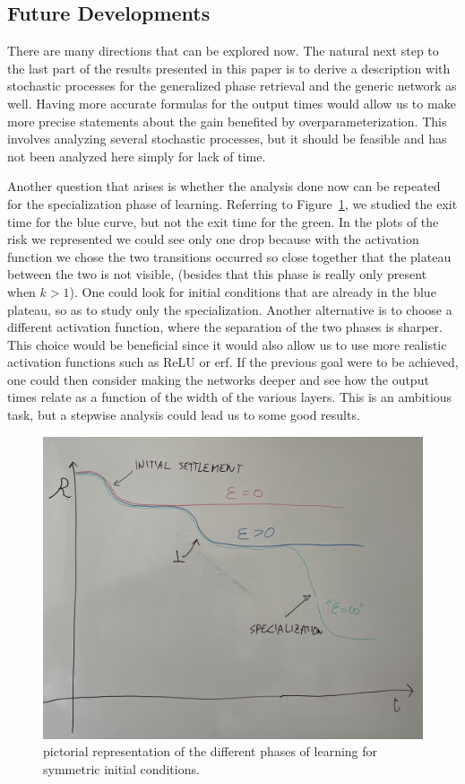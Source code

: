 \subsection*{Future Developments}
There are many directions that can be explored now.
The natural next step to the last part of the results presented in this paper is to derive a description with stochastic processes for the generalized phase retrieval and the generic network as well.
Having more accurate formulas for the output times would allow us to make more precise statements about the gain benefited by overparameterization.
This involves analyzing several stochastic processes, but it should be feasible and has not been analyzed here simply for lack of time.

Another question that arises is whether the analysis done now can be repeated for the specialization phase of learning. Referring to Figure~\ref{fig:pictorial-symmetric-learning2}, we studied the exit time for the blue curve, but not the exit time for the green. 
In the plots of the risk we represented we could see only one drop because with the activation function we chose the two transitions occurred so close together that the plateau between the two is not visible, (besides that this phase is really only present when \(k>1\)). 
One could look for initial conditions that are already in the blue plateau, so as to study only the specialization. Another alternative is to choose a different activation function, where the separation of the two phases is sharper. 
This choice would be beneficial since it would also allow us to use more realistic activation functions such as ReLU or erf.
If the previous goal were to be achieved, one could then consider making the networks deeper and see how the output times relate as a function of the width of the various layers. This is an ambitious task, but a stepwise analysis could lead us to some good results.
\begin{figure}
  \centering
  \includegraphics[width=.7\textwidth]{figures/symmetric-ic-expected-plateaus.jpg}
  \caption{
    pictorial representation of the different phases of learning for symmetric initial conditions.
  }
  \label{fig:pictorial-symmetric-learning2}
\end{figure}

